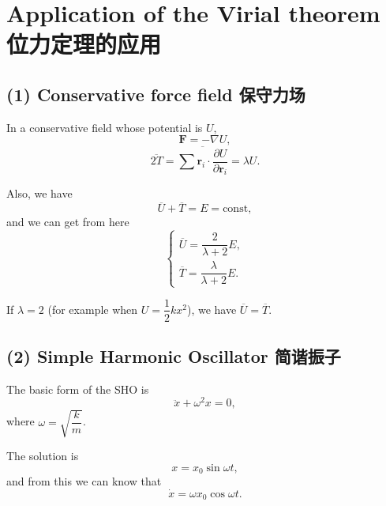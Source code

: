 \section{Application of the Virial theorem
位力定理的应用}\label{application-of-the-virial-theorem-ux4f4dux529bux5b9aux7406ux7684ux5e94ux7528}

\subsection*{(1) Conservative force field
保守力场}\label{conservative-force-field-ux4fddux5b88ux529bux573a}

In a conservative field whose potential is \(U\),
\[\boldsymbol{F} = - \nabla U,\]
\[\overline{2T} = \overline{\sum \boldsymbol{r}_i \cdot \dfrac{\partial U}{\partial \boldsymbol{r}_i}} = \lambda U.\]

Also, we have \[\overline{U} + \overline{T} = E = \mathrm{const},\] and we
can get from here \[\left\{
    \begin{array}{l}
        \overline{U} = \dfrac{2}{\lambda + 2} E, \\[1.5ex]
        \overline{T} = \dfrac{\lambda}{\lambda + 2} E.
    \end{array}
\right.\]

If \(\lambda = 2\) (for example when \(U = \dfrac{1}{2}k x^2\)), we have
\(\overline{U} = \overline{T}\).

\subsection*{(2) Simple Harmonic Oscillator
简谐振子}\label{simple-harmonic-oscillator-ux7b80ux8c10ux632fux5b50-2}

The basic form of the SHO is \[\ddot{x} + \omega^2 x = 0,\] where
\(\omega = \sqrt{\dfrac{k}{m}}\).

The solution is \[x = x_0 \sin \omega t,\] and from this we can know
that \[\dot x = \omega x_0 \cos \omega t.\]

